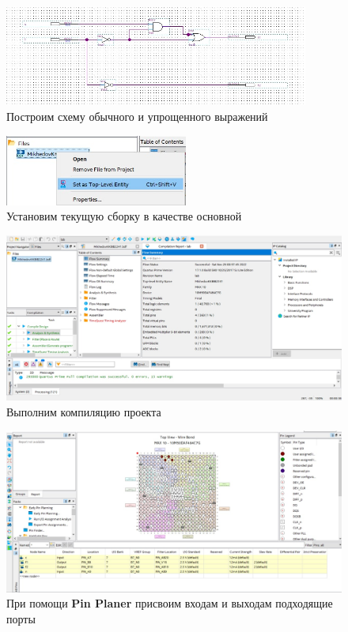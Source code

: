 \documentclass[a4paper,12pt]{article}
\begin{document}
  \begin{figure}[H]
    \centering
    \includegraphics[width=10cm]{01_08}
    \caption{Построим схему обычного и упрощенного выражений}
  \end{figure}

  \begin{figure}[H]
    \centering
    \includegraphics[width=6cm]{01_09}
    \caption{Установим текущую сборку в качестве основной}
  \end{figure}

  \begin{figure}[H]
    \centering
    \includegraphics[width=12cm]{01_10}
    \caption{Выполним компиляцию проекта}
  \end{figure}

  \begin{figure}[H]
    \centering
    \includegraphics[width=12cm]{01_11}
    \caption{При помощи \textbf{Pin Planer} присвоим входам и выходам подходящие порты}
  \end{figure}
\end{document}
